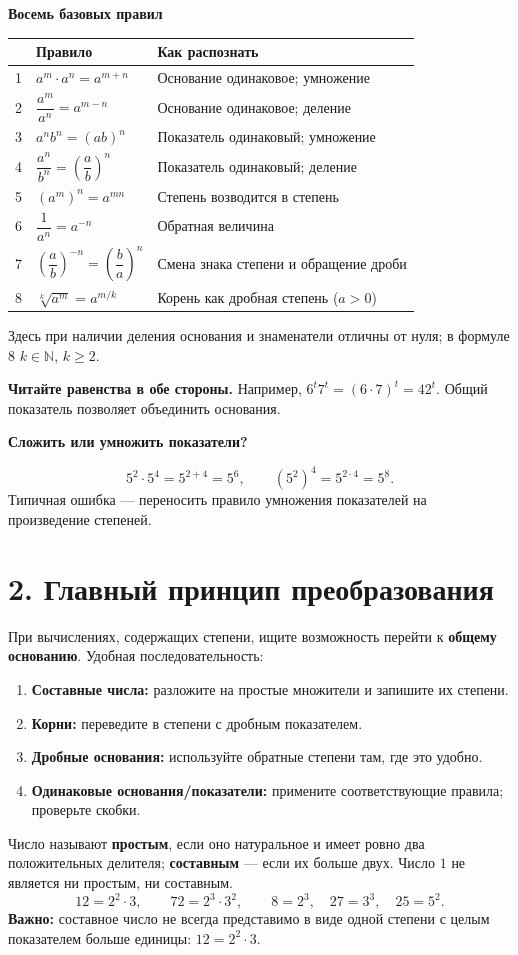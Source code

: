 \documentclass[a4paper,12pt]{article}
\newcommand{\key}[1]{\textcolor{darkaccent}{\textbf{#1}}}
\newcommand{\sub}[1]{\medskip\noindent\textcolor{darkaccent}{\large\bfseries #1}\par\vspace{2pt}}
\begin{document}
\sub{Восемь базовых правил}
\renewcommand{\arraystretch}{1.35}
\begin{tabularx}{\linewidth}{@{}p{6mm}X X@{}}
\toprule
& \textbf{Правило} & \textbf{Как распознать} \\
\midrule
1 & $a^m\cdot a^n=a^{m+n}$ & Основание одинаковое; умножение \\
2 & $\dfrac{a^m}{a^n}=a^{m-n}$ & Основание одинаковое; деление \\
3 & $a^n b^n=(ab)^n$ & Показатель одинаковый; умножение \\
4 & $\dfrac{a^n}{b^n}=\left(\dfrac{a}{b}\right)^n$ & Показатель одинаковый; деление \\
5 & $(a^m)^n=a^{mn}$ & Степень возводится в степень \\
6 & $\dfrac{1}{a^n}=a^{-n}$ & Обратная величина \\
7 & $\left(\dfrac{a}{b}\right)^{-n}=\left(\dfrac{b}{a}\right)^n$ & Смена знака степени и обращение дроби \\
8 & $\sqrt[k]{a^m}=a^{m/k}$ & Корень как дробная степень ($a>0$) \\
\bottomrule
\end{tabularx}
{\small Здесь при наличии деления основания и знаменатели отличны от нуля; в формуле 8 $k\in\mathbb N$, $k\ge2$.}

\key{Читайте равенства в обе стороны.} Например, $6^t7^t=(6\cdot7)^t=42^t$. Общий показатель позволяет объединить основания.

\sub{Сложить или умножить показатели?}
\[
 5^2\cdot5^4=5^{2+4}=5^6,
 \qquad (5^2)^4=5^{2\cdot4}=5^8.
\]
Типичная ошибка --- переносить правило умножения показателей на произведение степеней.

\section*{2. Главный принцип преобразования}
При вычислениях, содержащих степени, ищите возможность перейти к \key{общему основанию}. Удобная последовательность:
\begin{enumerate}
\item \key{Составные числа:} разложите на простые множители и запишите их степени.
\item \key{Корни:} переведите в степени с дробным показателем.
\item \key{Дробные основания:} используйте обратные степени там, где это удобно.
\item \key{Одинаковые основания/показатели:} примените соответствующие правила; проверьте скобки.
\end{enumerate}
Число называют \key{простым}, если оно натуральное и имеет ровно два положительных делителя; \key{составным} --- если их больше двух. Число $1$ не является ни простым, ни составным.
\[
 12=2^2\cdot3,\qquad 72=2^3\cdot3^2,\qquad
 8=2^3,\quad 27=3^3,\quad 25=5^2.
\]
\key{Важно:} составное число не всегда представимо в виде одной степени с целым показателем больше единицы: $12=2^2\cdot3$.
\end{document}
